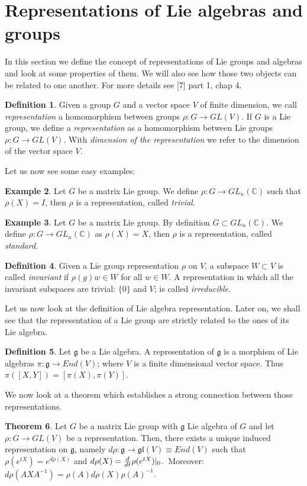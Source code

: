 \documentclass[12pt,a4paper]{report}
\theoremstyle{definition}
\newtheorem{Def}{Definition}[chapter]
\theoremstyle{Theorem}
\newtheorem{Theo}[Def]{Theorem}
\theoremstyle{definition}
\newtheorem{Ex}[Def]{Example}
\theoremstyle{definition}
\begin{document}
	\section{Representations of Lie algebras and groups}
	In this section we define the concept of representations of Lie groups and algebras and look at some properties of them. We will also see how those two objects can be related to one another. For more details see [7] part 1, chap 4.
	\begin{Def}
		Given a group $G$ and a vector space $V$ of finite dimension, we call \textit{representation} a homomorphism between groups $\rho:G\rightarrow GL(V)$.
		If $G$ is a Lie group, we define a \textit{representation} as a homomorphism between Lie groups $\rho:G\rightarrow GL(V)$. With \textit{dimension of the representation} we refer to the dimension of the vector space $V$.
	\end{Def}Let us now see some easy examples:
	\begin{Ex}
		Let $G$ be a matrix Lie group. We define $\rho: G\rightarrow GL_n(\mathbb{C})$ such that $\rho(X)=I$, then $\rho$ is a representation, called \textit{trivial}. 
	\end{Ex}
	\begin{Ex}
		Let $G$ be a matrix Lie group. By definition $G\subset GL_n(\mathbb{C})$. We define $\rho: G\rightarrow GL_n(\mathbb{C})$ as $\rho(X)=X$, then $\rho$ is a representation, called \textit{standard}. 
	\end{Ex}
	\begin{Def}
		Given a Lie group representation $\rho$ on $V$, a subspace $W\subset V$ is called \textit{invariant} if $\rho(g)w\in W$ for all $w\in W$.
		A representation in which all the invariant subspaces are trivial: $\{0\}$ and $V$; is called \textit{irreducible}.
	\end{Def}
	Let us now look at the definition of Lie algebra representation. Later on, we shall see that the representation of a Lie group are strictly related to the ones of its Lie algebra.
	\begin{Def}
		Let $\mathfrak{g}$ be a Lie algebra. A representation of $\mathfrak{g}$ is a morphism of Lie algebras $\pi:\mathfrak{g}\rightarrow End(V)$; where $V$ is a finite dimensional vector space. Thus $\pi([X,Y])=[\pi(X),\pi(Y)]$.
	\end{Def}
	We now look at a theorem which establishes a strong connection between those representations.
	\begin{Theo}
		Let $G$ be a matrix Lie group with $\mathfrak{g}$ Lie algebra of $G$ and let $\rho:G\rightarrow GL(V)$ be a representation. Then, there exists a unique induced representation on $\mathfrak{g}$, namely $d\rho:\mathfrak{g}\rightarrow \mathfrak{gl}(V)\equiv End(V)$ such that $\rho(e^{tX})=e^{d\rho(X)}$ and $d\rho(X)={d\over dt}\rho(e^{tX})|_0$.\
		Moreover: $d\rho(AXA^{-1})=\rho(A)d\rho(X)\rho(A)^{-1}$.	
	\end{Theo}
\end{document}
